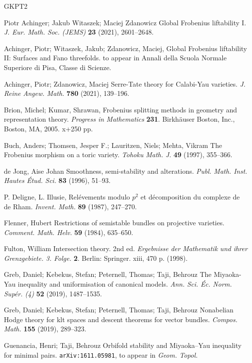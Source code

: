 \documentclass[12pt]{article}
\theoremstyle{plain}
\theoremstyle{definition}
\theoremstyle{remark}
\begin{document}
\begin{thebibliography}{GKPT2}


 Piotr Achinger; Jakub Witaszek; Maciej Zdanowicz
Global Frobenius liftability I.
\emph{J. Eur. Math. Soc. (JEMS) } {\bf 23} (2021),  2601--2648. 

 Achinger, Piotr; Witaszek, Jakub; Zdanowicz, Maciej, 
Global Frobenius liftability II: Surfaces and Fano threefolds.
to appear in Annali della Scuola Normale Superiore di Pisa, Classe di Scienze.

  Achinger, Piotr; Zdanowicz, Maciej Serre-Tate theory for Calabi-Yau varieties. 
\emph{J. Reine Angew. Math.} {\bf 780} (2021), 139--196.

  Brion, Michel; Kumar, Shrawan, Frobenius splitting methods in geometry and representation theory. \emph{Progress in Mathematics} {\bf 231}. Birkh\"auser Boston, Inc., Boston, MA, 2005. x+250 pp.

 Buch, Anders; Thomsen, Jesper F.; Lauritzen, Niels; Mehta, Vikram The Frobenius morphism on a toric variety. 
\emph{Tohoku Math. J. }  {\bf 49} (1997), 355--366.

 de Jong, Aise Johan Smoothness, semi-stability and alterations. 
\emph{Publ. Math. Inst. Hautes \'Etud. Sci.} {\bf 83} (1996), 51--93.

 P. Deligne, L. Illusie, 
Rel\'evements modulo $p^2$ et d\'ecomposition du complexe de de 
Rham.  \emph{Invent. Math.} {\bf 89} (1987), 247--270. 

Flenner, Hubert 
Restrictions of semistable bundles on projective varieties.
\emph{Comment. Math. Helv.} {\bf 59} (1984), 635--650. 


 Fulton, William Intersection theory.  2nd ed. 
\emph{Ergebnisse der Mathematik und ihrer Grenzgebiete. 3. Folge.} {\bf 2}. Berlin: Springer. xiii, 470 p. (1998).


 Greb, Daniel; Kebekus, Stefan; Peternell, Thomas; Taji, Behrouz The Miyaoka-Yau inequality and uniformisation of canonical models. \emph{Ann. Sci. \'Ec. Norm. Sup\'er. (4)} 
{\bf 52} (2019), 1487--1535. 

 Greb, Daniel; Kebekus, Stefan; Peternell, Thomas; Taji, Behrouz Nonabelian Hodge theory for klt spaces and descent theorems for vector bundles. \emph{Compos. Math.} 
{\bf 155} (2019), 289--323. 

 Guenancia, Henri; Taji, Behrouz Orbifold stability and Miyaoka--Yau inequality for minimal pairs. {\tt arXiv:1611.05981}, to appear in \emph{Geom. Topol.}



\end{thebibliography}
\end{document}
